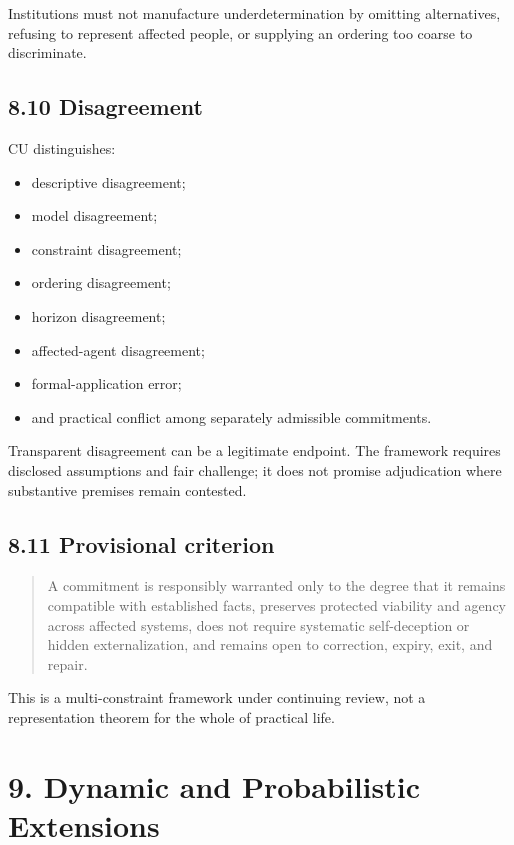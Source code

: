\documentclass[
  11pt,
]{article}
\providecommand{\tightlist}{%
  \setlength{\itemsep}{0pt}\setlength{\parskip}{0pt}}
\begin{document}
Institutions must not manufacture underdetermination by omitting
alternatives, refusing to represent affected people, or supplying an
ordering too coarse to discriminate.

\subsection{8.10 Disagreement}\label{disagreement-1}

CU distinguishes:

\begin{itemize}
\tightlist
\item
  descriptive disagreement;
\item
  model disagreement;
\item
  constraint disagreement;
\item
  ordering disagreement;
\item
  horizon disagreement;
\item
  affected-agent disagreement;
\item
  formal-application error;
\item
  and practical conflict among separately admissible commitments.
\end{itemize}

Transparent disagreement can be a legitimate endpoint. The framework
requires disclosed assumptions and fair challenge; it does not promise
adjudication where substantive premises remain contested.

\subsection{8.11 Provisional criterion}\label{provisional-criterion}

\begin{quote}
A commitment is responsibly warranted only to the degree that it remains
compatible with established facts, preserves protected viability and
agency across affected systems, does not require systematic
self-deception or hidden externalization, and remains open to
correction, expiry, exit, and repair.
\end{quote}

This is a multi-constraint framework under continuing review, not a
representation theorem for the whole of practical life.

\section{9. Dynamic and Probabilistic
Extensions}\label{dynamic-and-probabilistic-extensions}
\end{document}
